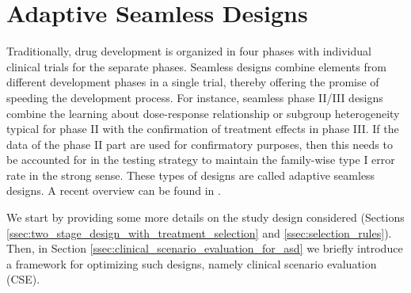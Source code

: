 \documentclass[bimj,fleqn]{w-art}
\theoremstyle{plain}
\theoremstyle{definition}
\begin{document}



\section{Adaptive Seamless Designs}
\label{sec:adaptive_seamless_designs}

Traditionally, drug development is organized in four phases with individual clinical trials for the separate phases. Seamless designs combine elements from different development phases in a single trial, thereby offering the promise of speeding the development process. For instance, seamless phase II/III designs combine the learning about dose-response relationship or subgroup heterogeneity typical for phase II with the confirmation of treatment effects in phase III. If the data of the phase II part are used for confirmatory purposes, then this needs to be accounted for in the testing strategy to maintain the family-wise type I error rate in the strong sense. These types of designs are called adaptive seamless designs. A recent overview can be found in \citet{friede_adaptive_2020}.

We start by providing some more details on the study design considered (Sections \ref{ssec:two_stage_design_with_treatment_selection} and \ref{ssec:selection_rules}). Then, in Section \ref{ssec:clinical_scenario_evaluation_for_asd} we briefly introduce a framework for optimizing such designs, namely clinical scenario evaluation (CSE). %
\end{document}
